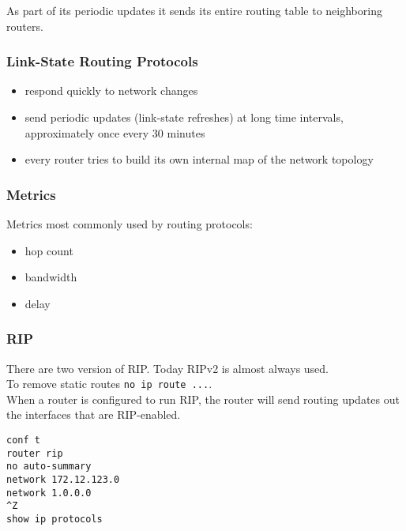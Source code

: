 As part of its periodic updates it sends its entire routing table to
neighboring routers.

\subsubsection{Link-State Routing Protocols}

\begin{itemize}

\item respond quickly to network changes

\item send periodic updates (link-state refreshes) at long time intervals,
approximately once every 30 minutes

\item every router tries to build its own internal map of the network topology

\end{itemize}

\subsubsection{Metrics}

Metrics most commonly used by routing protocols:

\begin{itemize}

\item hop count
\item bandwidth
\item delay

\end{itemize}

\subsubsection{RIP}

There are two version of RIP. Today RIPv2 is almost always used.\\

To remove static routes \texttt{no ip route ...}.\\

When a router is configured to run RIP, the router will send routing updates
out the interfaces that are RIP-enabled.

\begin{verbatim}
conf t
router rip
no auto-summary
network 172.12.123.0
network 1.0.0.0
^Z
show ip protocols
\end{verbatim}

